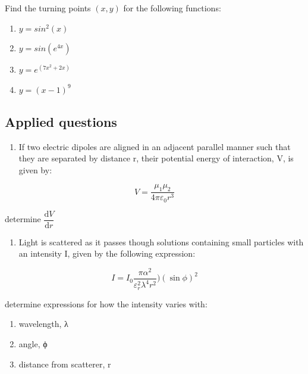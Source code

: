\documentclass[
]{book}
\providecommand{\tightlist}{%
  \setlength{\itemsep}{0pt}\setlength{\parskip}{0pt}}
\begin{document}
Find the turning points \((x,y)\) for the following functions:

\begin{enumerate}
\def\labelenumi{\arabic{enumi}.}
\tightlist
\item
  \(y = sin^2(x)\)
\item
  \(y = sin(e^{4x})\)
\item
  \(y = e^{(7x^2 + 2x)}\)
\item
  \(y = (x-1)^9\)
\end{enumerate}

\hypertarget{applied-questions}{%
\subsection{Applied questions}\label{applied-questions}}

\begin{enumerate}
\def\labelenumi{\arabic{enumi}.}
\tightlist
\item
  If two electric dipoles are aligned in an adjacent parallel manner such that they are separated by distance r, their potential energy of interaction, V, is given by:
\end{enumerate}

\begin{equation*}
V = \frac{\mu_1 \mu_2}{4 \pi \varepsilon_0 r^3}
\end{equation*}

determine \(\dfrac{\textrm{d}V}{\textrm{d}r}\)

\begin{enumerate}
\def\labelenumi{\arabic{enumi}.}
\setcounter{enumi}{1}
\tightlist
\item
  Light is scattered as it passes though solutions containing small particles with an intensity I, given by the following expression:
\end{enumerate}

\begin{equation*}
I = I_0 \frac{\pi \alpha ^2}{\varepsilon _r^2 \lambda^4 r^2})(\sin \phi)^2
\end{equation*}

determine expressions for how the intensity varies with:

\begin{enumerate}
\def\labelenumi{\alph{enumi}.}
\tightlist
\item
  wavelength, λ
\item
  angle, ϕ
\item
  distance from scatterer, r
\end{enumerate}
\end{document}

